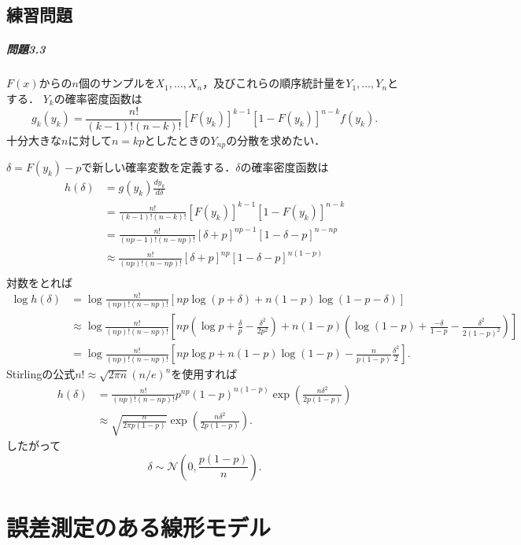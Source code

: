 \section*{練習問題}
\paragraph{問題3.3}
\(F(x)\)からの\(n\)個のサンプルを\(X_1, \ldots, X_n\)，及びこれらの順序統計量を\(Y_1, \ldots, Y_n\)とする．
\(Y_k\)の確率密度函数は
\[ g_k(y_k) = \frac{n!}{(k-1)!(n-k)!} [F(y_k)]^{k-1} [1 - F(y_k)]^{n-k} f(y_k) . \]
十分大きな\(n\)に対して\(n = kp\)としたときの\(Y_{np}\)の分散を求めたい．

\(\delta = F(y_k) - p\)で新しい確率変数を定義する．\(\delta\)の確率密度函数は
\begin{align*}
  h(\delta) &= g(y_k) \frac{dy_k}{d\delta} \\
  &= \frac{n!}{(k-1)!(n-k)!} [F(y_k)]^{k-1} [1 - F(y_k)]^{n-k} \\
  &= \frac{n!}{(np-1)!(n-np)!} [\delta + p]^{np-1} [1 - \delta - p]^{n-np} \\
  &\approx \frac{n!}{(np)!(n-np)!} [\delta + p]^{np} [1 - \delta - p]^{n(1-p)} \\
\end{align*}
対数をとれば
\begin{align*}
  \log h(\delta) &= \log \frac{n!}{(np)!(n-np)!} \left[ np \log(p + \delta) + n(1-p) \log(1-p-\delta) \right] \\
  &\approx \log \frac{n!}{(np)!(n-np)!} \left[ np \left( \log p + \frac{\delta}{p} - \frac{\delta^2}{2p^2} \right) + n(1-p) \left( \log(1-p) + \frac{-\delta}{1-p} - \frac{\delta^2}{2(1-p)^2} \right) \right] \\
  &= \log \frac{n!}{(np)!(n-np)!} \left[ np \log p + n(1-p) \log (1-p) - \frac{n}{p(1-p)} \frac{\delta^2}{2} \right] .
\end{align*}
Stirlingの公式\(n! \approx \sqrt{2\pi n} (n/e)^n\)を使用すれば
\begin{align*}
  h(\delta) &= \frac{n!}{(np)!(n-np)!} p^{np} (1-p)^{n(1-p)} \exp \left( \frac{n\delta^2}{2p(1-p)} \right) \\
  &\approx \sqrt{\frac{n}{2\pi p(1-p)}} \exp \left( \frac{n\delta^2}{2p(1-p)} \right) .
\end{align*}
したがって
\[ \delta \sim \mathcal{N} \left( 0, \frac{p(1-p)}{n} \right) . \]

\setcounter{chapter}{4}
\chapter{誤差測定のある線形モデル}
